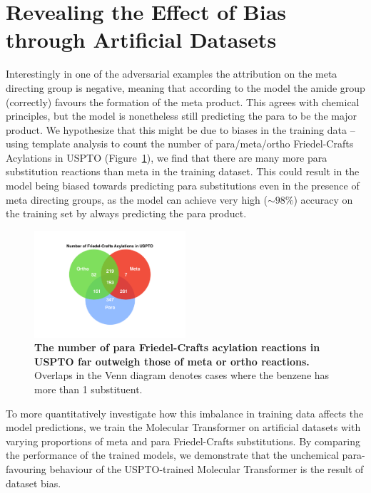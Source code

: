 \section{Revealing the Effect of Bias through Artificial Datasets}
Interestingly in one of the adversarial examples the attribution on the meta directing group is negative, meaning that according to the model the amide group (correctly) favours the formation of the meta product. This agrees with chemical principles, but the model is nonetheless still predicting the para to be the major product. We hypothesize that this might be due to biases in the training data -- using template analysis to count the number of para/meta/ortho Friedel-Crafts Acylations in USPTO (Figure~\ref{fig:venn_friedel}), we find that there are many more para substitution reactions than meta in the training dataset. This could result in the model being biased towards predicting para substitutions even in the presence of meta directing groups, as the model can achieve very high ($\sim 98\%$) accuracy on the training set by always predicting the para product.

\begin{figure}[htb!] 
    \centering    
    \includegraphics[width=0.5\textwidth]{Chapters/Transformer/Figs/venn.pdf}
    \caption{ \textbf{The number of para Friedel-Crafts acylation reactions in USPTO far outweigh those of meta or ortho reactions.} Overlaps in the Venn diagram denotes cases where the benzene has more than 1 substituent.}
    \label{fig:venn_friedel}
\end{figure}

To more quantitatively investigate how this imbalance in training data affects the model predictions, we train the Molecular Transformer on artificial datasets with varying proportions of meta and para Friedel-Crafts substitutions. By comparing the performance of the trained models, we demonstrate that the unchemical para-favouring behaviour of the USPTO-trained Molecular Transformer is the result of dataset bias.


